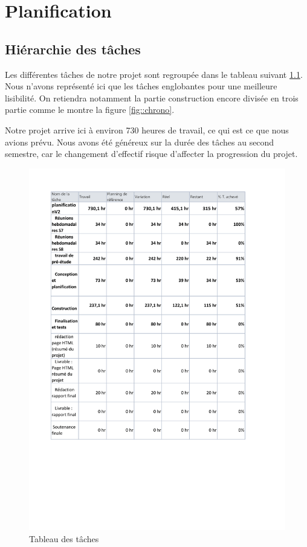 \chapter{Planification}

\section{Hiérarchie des tâches}
Les différentes tâches de notre projet sont regroupée dans le tableau suivant \ref{fig::taches}. Nous n'avons représenté ici que les tâches englobantes pour une meilleure lisibilité. On retiendra notamment la partie construction encore divisée en trois partie comme le montre la figure \ref{fig::chrono}.

Notre projet arrive ici à environ 730 heures de travail, ce qui est ce que nous avions prévu. Nous avons été généreux sur la durée des tâches au second semestre, car le changement d'effectif risque d'affecter la progression du projet.

\begin{figure}[H]
	\centering
	\includegraphics[scale=0.5]{images/taches.pdf}
	\caption{Tableau des tâches}
	\label{fig::taches}
\end{figure}

